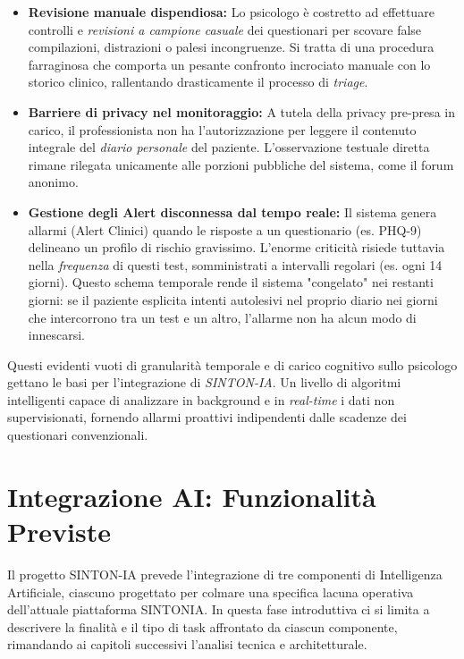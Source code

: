 \vspace{0.4cm}
\begin{itemize}
    \item \textbf{Revisione manuale dispendiosa:} Lo psicologo è costretto ad effettuare controlli e \textit{revisioni a campione casuale} dei questionari per scovare false compilazioni, distrazioni o palesi incongruenze. Si tratta di una procedura farraginosa che comporta un pesante confronto incrociato manuale con lo storico clinico, rallentando drasticamente il processo di \textit{triage}.

    \item \textbf{Barriere di privacy nel monitoraggio:} A tutela della privacy pre-presa in carico, il professionista non ha l'autorizzazione per leggere il contenuto integrale del \textit{diario personale} del paziente. L'osservazione testuale diretta rimane rilegata unicamente alle porzioni pubbliche del sistema, come il forum anonimo.

    \item \textbf{Gestione degli Alert disconnessa dal tempo reale:} Il sistema genera allarmi (Alert Clinici) quando le risposte a un questionario (es. PHQ-9) delineano un profilo di rischio gravissimo. L'enorme criticità risiede tuttavia nella \textit{frequenza} di questi test, somministrati a intervalli regolari (es. ogni 14 giorni). Questo schema temporale rende il sistema "congelato" nei restanti giorni: se il paziente esplicita intenti autolesivi nel proprio diario nei giorni che intercorrono tra un test e un altro, l'allarme non ha alcun modo di innescarsi.
\end{itemize}

Questi evidenti vuoti di granularità temporale e di carico cognitivo sullo psicologo gettano le basi per l'integrazione di \textit{SINTON-IA}. Un livello di algoritmi intelligenti capace di analizzare in background e in \textit{real-time} i dati non supervisionati, fornendo allarmi proattivi indipendenti dalle scadenze dei questionari convenzionali.

\clearpage
\section{Integrazione AI: Funzionalità Previste}
\label{sec:funzionalita_implementate}
Il progetto SINTON-IA prevede l'integrazione di tre componenti di Intelligenza Artificiale, ciascuno progettato per colmare una specifica lacuna operativa dell'attuale piattaforma SINTONIA. In questa fase introduttiva ci si limita a descrivere la finalità e il tipo di task affrontato da ciascun componente, rimandando ai capitoli successivi l'analisi tecnica e architetturale.

